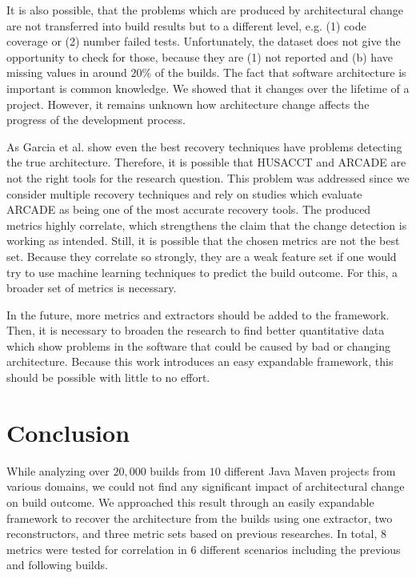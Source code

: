\documentclass[sigplan, anonymous, review]{acmart}
\begin{document}
It is also possible, that the problems which are produced by architectural change are not transferred into build results but to a different level, e.g. (1) code coverage or (2) number failed tests. Unfortunately, the dataset does not give the opportunity to check for those, because they are (1) not reported and (b) have missing values in around $20\%$ of the builds. The fact that software architecture is important is common knowledge. We showed that it changes over the lifetime of a project. However, it remains unknown how architecture change affects the progress of the development process.

As Garcia et al. \cite{arcRec-comparison} show even the best recovery techniques have problems detecting the true architecture. Therefore, it is possible that HUSACCT and ARCADE are not the right tools for the research question. This problem was addressed since we consider multiple recovery techniques and rely on studies which evaluate ARCADE as being one of the most accurate recovery tools. The produced metrics highly correlate, which strengthens the claim that the change detection is working as intended. Still, it is possible that the chosen metrics are not the best set. Because they correlate so strongly, they are a weak feature set if one would try to use machine learning techniques to predict the build outcome. For this, a broader set of metrics is necessary. 

In the future, more metrics and extractors should be added to the framework. Then, it is necessary to broaden the research to find better quantitative data which show problems in the software that could be caused by bad or changing architecture. Because this work introduces an easy expandable framework, this should be possible with little to no effort.

\section{Conclusion}


While analyzing over $20,000$ builds from $10$ different Java Maven projects from various domains, we could not find any significant impact of architectural change on build outcome.
We approached this result through an easily expandable framework to recover the architecture from the builds using one extractor, two reconstructors, and three metric sets based on previous researches. In total, $8$ metrics were tested for correlation in $6$ different scenarios including the previous and following builds. 
\end{document}
